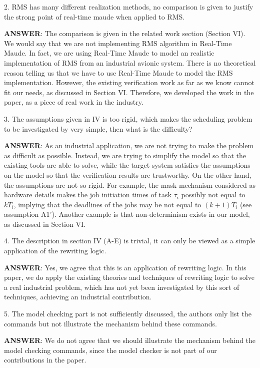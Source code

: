 \documentclass[10pt,journal]{IEEEtran}
\newcommand{\ANSWER}{{\bf ANSWER}}
\begin{document}
2. RMS has many different realization methods, no comparison is given
to justify the strong point of real-time maude when applied to RMS.

\ANSWER: The comparison is given in the related work section (Section
VI). We would say that we are not implementing RMS algorithm in
Real-Time Maude. In fact, we are using Real-Time Maude to model an
realistic implementation of RMS from an industrial avionic
system. There is no theoretical reason telling us that we have to use
Real-Time Maude to model the RMS implementation. However, the existing
verification work as far as we know cannot fit our needs, as discussed
in Section VI. Therefore, we developed the work in the paper, as a
piece of real work in the industry.

3. The assumptions given in IV is too rigid, which makes the
scheduling problem to be investigated by very simple, then what is the
difficulty?

\ANSWER: As an industrial application, we are not trying to make the
problem as difficult as possible. Instead, we are trying to simplify
the model so that the existing tools are able to solve, while the
target system satisfies the assumptions on the model so that the
verification results are trustworthy. On the other hand, the
assumptions are not so rigid. For example, the mask mechanism
considered as hardware details makes the job initiation times of task
$\tau_i$ possibly not equal to $kT_i$, implying that the deadlines of
the jobs may be not equal to $(k+1)T_i$ (see assumption A1'). Another
example is that non-determinism exists in our model, as discussed in
Section VI.

4. The description in section IV (A-E) is trivial, it can only be
viewed as a simple application of the rewriting logic.

\ANSWER: Yes, we agree that this is an application of rewriting
logic. In this paper, we do apply the existing theories and techniques
of rewriting logic to solve a real industrial problem, which has not
yet been investigated by this sort of techniques, achieving an
industrial contribution.

5. The model checking part is not sufficiently discussed, the authors
only list the commands but not illustrate the mechanism behind these
commands.

\ANSWER: We do not agree that we should illustrate the mechanism behind
the model checking commands, since the model checker is not part of
our contributions in the paper.
\end{document}

